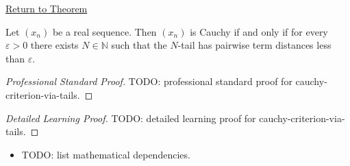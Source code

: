 \newpage
{}
\label{prf:cauchy-criterion-via-tails}

\begin{remark*}[Return]
\hyperref[thm:cauchy-criterion-via-tails]{Return to Theorem}
\end{remark*}

\begin{theorem*}
Let $(x_n)$ be a real sequence. Then $(x_n)$ is Cauchy if and only if
for every $\varepsilon>0$ there exists $N\in\mathbb{N}$ such that the
$N$-tail has pairwise term distances less than $\varepsilon$.

\smallskip
\noindent
\end{theorem*}

\begin{proof}[Professional Standard Proof]
\LRAProofBodyStart
TODO: professional standard proof for cauchy-criterion-via-tails.
\end{proof}

\begin{proof}[Detailed Learning Proof]
\LRAProofBodyStart
TODO: detailed learning proof for cauchy-criterion-via-tails.
\end{proof}

\begin{remark*}
\end{remark*}

\begin{dependencies}
\begin{itemize}
  \item TODO: list mathematical dependencies.
\end{itemize}
\end{dependencies}

\clearpage
